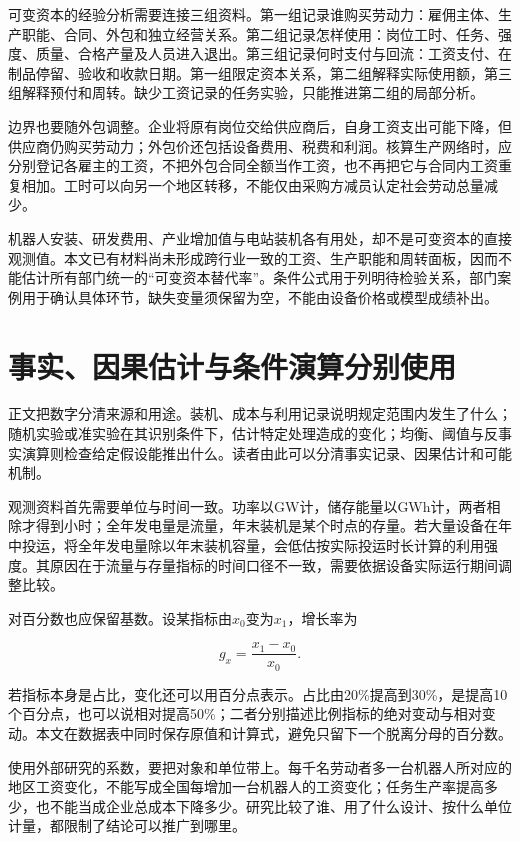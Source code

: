 \documentclass[UTF8,fontset=windows,12pt,a4paper,oneside,openany]{ctexbook}
\begin{document}
可变资本的经验分析需要连接三组资料。第一组记录谁购买劳动力：雇佣主体、生产职能、合同、外包和独立经营关系。第二组记录怎样使用：岗位工时、任务、强度、质量、合格产量及人员进入退出。第三组记录何时支付与回流：工资支付、在制品停留、验收和收款日期。第一组限定资本关系，第二组解释实际使用额，第三组解释预付和周转。缺少工资记录的任务实验，只能推进第二组的局部分析。

边界也要随外包调整。企业将原有岗位交给供应商后，自身工资支出可能下降，但供应商仍购买劳动力；外包价还包括设备费用、税费和利润。核算生产网络时，应分别登记各雇主的工资，不把外包合同全额当作工资，也不再把它与合同内工资重复相加。工时可以向另一个地区转移，不能仅由采购方减员认定社会劳动总量减少。

机器人安装、研发费用、产业增加值与电站装机各有用处，却不是可变资本的直接观测值。本文已有材料尚未形成跨行业一致的工资、生产职能和周转面板，因而不能估计所有部门统一的“可变资本替代率”。条件公式用于列明待检验关系，部门案例用于确认具体环节，缺失变量须保留为空，不能由设备价格或模型成绩补出。

\section{事实、因果估计与条件演算分别使用}

正文把数字分清来源和用途。装机、成本与利用记录说明规定范围内发生了什么；随机实验或准实验在其识别条件下，估计特定处理造成的变化；均衡、阈值与反事实演算则检查给定假设能推出什么。读者由此可以分清事实记录、因果估计和可能机制。

观测资料首先需要单位与时间一致。功率以GW计，储存能量以GWh计，两者相除才得到小时；全年发电量是流量，年末装机是某个时点的存量。若大量设备在年中投运，将全年发电量除以年末装机容量，会低估按实际投运时长计算的利用强度。其原因在于流量与存量指标的时间口径不一致，需要依据设备实际运行期间调整比较。

对百分数也应保留基数。设某指标由\(x_0\)变为\(x_1\)，增长率为

\[
g_x=\frac{x_1-x_0}{x_0}.
\tag{3-1}
\]

若指标本身是占比，变化还可以用百分点表示。占比由20\%提高到30\%，是提高10个百分点，也可以说相对提高50\%；二者分别描述比例指标的绝对变动与相对变动。本文在数据表中同时保存原值和计算式，避免只留下一个脱离分母的百分数。

使用外部研究的系数，要把对象和单位带上。每千名劳动者多一台机器人所对应的地区工资变化，不能写成全国每增加一台机器人的工资变化；任务生产率提高多少，也不能当成企业总成本下降多少。研究比较了谁、用了什么设计、按什么单位计量，都限制了结论可以推广到哪里。
\end{document}
